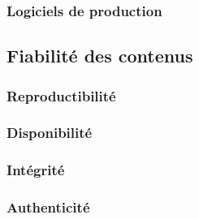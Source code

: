 \subsubsection{Logiciels de production}

\subsection{Fiabilité des contenus}

\subsubsection{Reproductibilité}

\subsubsection{Disponibilité}

\subsubsection{Intégrité}

\subsubsection{Authenticité}

\pagebreak
